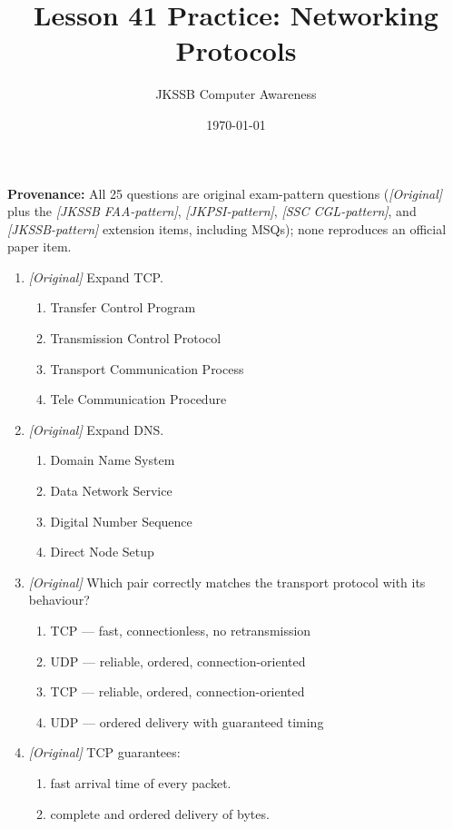 \documentclass[11pt]{article}
\title{Lesson 41 Practice: Networking Protocols}
\author{JKSSB Computer Awareness}
\date{\today}
\begin{document}
\maketitle
\noindent\textbf{Provenance:} All 25 questions are original exam-pattern questions (\textit{[Original]} plus the \textit{[JKSSB FAA-pattern]}, \textit{[JKPSI-pattern]}, \textit{[SSC CGL-pattern]}, and \textit{[JKSSB-pattern]} extension items, including MSQs); none reproduces an official paper item.

\begin{enumerate}[label=\textbf{Q\arabic*.}, leftmargin=*]
\item \textit{[Original]} Expand TCP.
  \begin{enumerate}[label=\Alph*.]
    \item Transfer Control Program
    \item Transmission Control Protocol
    \item Transport Communication Process
    \item Tele Communication Procedure
  \end{enumerate}
\item \textit{[Original]} Expand DNS.
  \begin{enumerate}[label=\Alph*.]
    \item Domain Name System
    \item Data Network Service
    \item Digital Number Sequence
    \item Direct Node Setup
  \end{enumerate}
\item \textit{[Original]} Which pair correctly matches the transport protocol
  with its behaviour?
  \begin{enumerate}[label=\Alph*.]
    \item TCP --- fast, connectionless, no retransmission
    \item UDP --- reliable, ordered, connection-oriented
    \item TCP --- reliable, ordered, connection-oriented
    \item UDP --- ordered delivery with guaranteed timing
  \end{enumerate}
\item \textit{[Original]} TCP guarantees:
  \begin{enumerate}[label=\Alph*.]
    \item fast arrival time of every packet.
    \item complete and ordered delivery of bytes.

\end{enumerate}
\end{enumerate}
\end{document}
